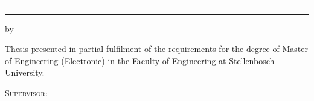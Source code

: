 \graphicspath{{frontmatter/fig/}}

\begin{titlepage}
	
	\centering
	
	
	~\vspace{1.5em}
	
	\rule{\textwidth}{1.5pt} 
	\vspace{1.0em} 
	
	{\Huge \scshape \titlecap{\ThesisTitle} \par}
	
	\vspace{1.0em} 
	\rule{\textwidth}{1.5pt}
	
	\vspace{3em}
	
	{\Large by \par}
	
	\vspace{2em}
	
	{\LARGE \textsc{\Author} \par}
	
	{\Large \Studentnumber}
	
	\vspace{8em}
	
	{\large Thesis presented in partial fulfilment of the requirements for the degree of Master of Engineering (Electronic) in the Faculty of Engineering at Stellenbosch University. \par}
	
	\vspace{6em}
	
	{\large \textsc{Supervisor}: \Supervisor \\
		\Department \par}
	
	\vspace{3em}
	
	{\Large \Date}
	
\end{titlepage}


% 
% 
% 
% 
